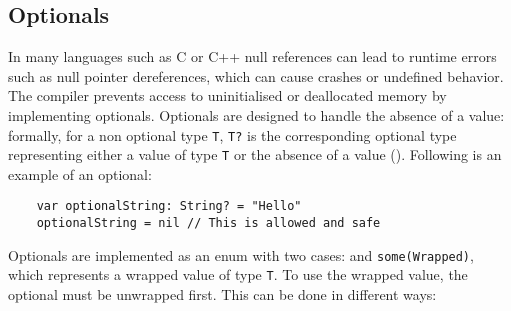 \subsection{Optionals}
\label{sec:optionals}
In many languages such as C or C++ null references can lead to runtime errors such as null pointer dereferences, which can cause crashes or undefined behavior.
The compiler prevents access to uninitialised or deallocated memory by implementing optionals. Optionals are designed to handle the absence of a value: formally, for a non optional type \lstinline{T}, \lstinline{T?} is the corresponding optional type representing either a value of type \lstinline{T} or the absence of a value (). Following is an example of an optional:
\begin{verbatim}
    var optionalString: String? = "Hello"
    optionalString = nil // This is allowed and safe
\end{verbatim}
Optionals are implemented as an enum with two cases:  and \lstinline{some(Wrapped)}, which represents a wrapped value of type \lstinline{T}.
To use the wrapped value, the optional must be unwrapped first. This can be done in different ways:
